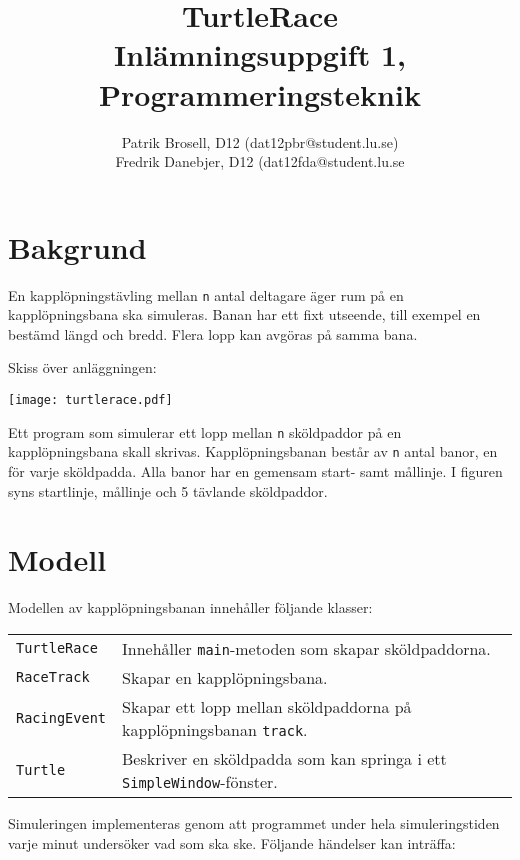 \documentclass[a4paper]{article}
\title{TurtleRace \\
	Inlämningsuppgift 1, Programmeringsteknik}
\author{Patrik Brosell, D12 (dat12pbr@student.lu.se)\\
Fredrik Danebjer, D12 (dat12fda@student.lu.se}
\newcommand{\code}[1]{\texttt{#1}} %
\begin{document}

\maketitle                    %

\section{Bakgrund}
En kapplöpningstävling mellan \texttt{n} antal deltagare äger rum på en kapplöpningsbana ska simuleras. Banan har ett fixt utseende, till exempel en bestämd längd och bredd. Flera lopp kan avgöras på samma bana.

Skiss över anläggningen:

\begin{center}
\texttt{[image: turtlerace.pdf]}
\end{center}

Ett program som simulerar ett lopp mellan \texttt{n} sköldpaddor på en kapplöpningsbana skall skrivas. Kapplöpningsbanan består av \texttt{n} antal banor, en för varje sköldpadda. Alla banor har en gemensam
 start- samt mållinje. I figuren syns startlinje, mållinje och 5 tävlande sköldpaddor.


\section{Modell}
Modellen av kapplöpningsbanan innehåller följande klasser:

\begin{tabular}{lp{8cm}}
\code{TurtleRace} & Innehåller \code{main}-metoden som skapar sköldpaddorna. \\
\code{RaceTrack} & Skapar en kapplöpningsbana. \\
\code{RacingEvent} & Skapar ett lopp mellan sköldpaddorna på kapplöpningsbanan \code{track}. \\
\code{Turtle} & Beskriver en sköldpadda som kan springa i ett \code{SimpleWindow}-fönster. \\
\end{tabular}

\vspace{\baselineskip}
Simuleringen implementeras genom att programmet under hela simuleringstiden varje minut undersöker vad som ska ske. Följande händelser kan inträffa:
\end{document}
